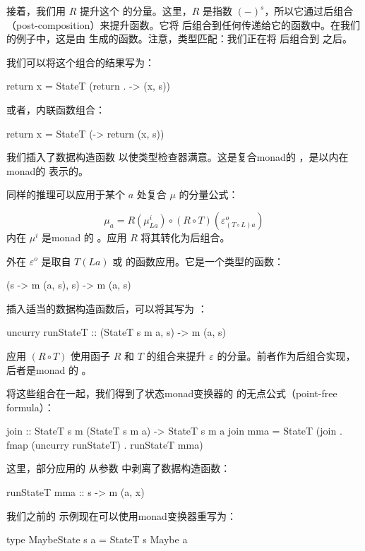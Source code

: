 \documentclass[DaoFP]{subfiles}
\begin{document}
    接着，我们用 $R$ 提升这个  的分量。这里，$R$ 是指数 $(-)^s$，所以它通过后组合（post-composition）来提升函数。它将  后组合到任何传递给它的函数中。在我们的例子中，这是由  生成的函数。注意，类型匹配：我们正在将  后组合到  之后。

    我们可以将这个组合的结果写为：
    \begin{haskell}
        return x = StateT (return . \s -> (x, s))
    \end{haskell}
    或者，内联函数组合：
    \begin{haskell}
        return x = StateT (\s -> return (x, s))
    \end{haskell}
    我们插入了数据构造函数  以使类型检查器满意。这是复合monad的 ，是以内在monad的  表示的。

    同样的推理可以应用于某个 $a$ 处复合 $\mu$ 的分量公式：

    \[ \mu_a = R(\mu^i_{L a}) \circ (R \circ T) (\varepsilon^o_{(T\circ L) a})\]
    内在 $\mu^i$ 是monad  的 。应用 $R$ 将其转化为后组合。

    外在 $\varepsilon^o$ 是取自 $T(L a)$ 或  的函数应用。它是一个类型的函数：
    \begin{haskell}
        (s -> m (a, s), s) -> m (a, s)
    \end{haskell}
    插入适当的数据构造函数后，可以将其写为 ：
    \begin{haskell}
        uncurry runStateT :: (StateT s m a, s) -> m (a, s)
    \end{haskell}
    应用 $(R \circ T)$ 使用函子 $R$ 和 $T$ 的组合来提升 $\varepsilon$ 的分量。前者作为后组合实现，后者是monad  的 。

    将这些组合在一起，我们得到了状态monad变换器的  的无点公式（point-free formula）：
    \begin{haskell}
        join :: StateT s m (StateT s m a) -> StateT s m a
        join mma = StateT (join . fmap (uncurry runStateT) . runStateT mma)
    \end{haskell}
    这里，部分应用的  从参数  中剥离了数据构造函数：
    \begin{haskell}
        runStateT mma :: s -> m (a, x)
    \end{haskell}

    我们之前的  示例现在可以使用monad变换器重写为：
    \begin{haskell}
        type MaybeState s a = StateT s Maybe a
    \end{haskell}
\end{document}

